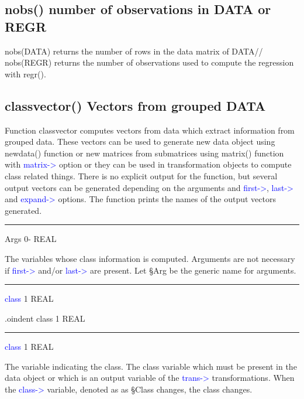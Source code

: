 \subsection{\textcolor{VioletRed}{nobs}() number of observations in DATA or REGR}
\label{nobs}
\textcolor{VioletRed}{nobs}(DATA) returns the number of rows in the data matrix of DATA//
\textcolor{VioletRed}{nobs}(REGR) returns the number of observations used to compute
the regression with \textcolor{VioletRed}{regr}().
\subsection{\textcolor{VioletRed}{classvector}() Vectors from grouped DATA}
\label{classvector}
Function classvector computes vectors from data which extract information from grouped
data. These vectors can be used to generate new data object using \textcolor{VioletRed}{newdata}() function or
new matrices from submatrices using \textcolor{VioletRed}{matrix}() function with \textcolor{blue}{matrix->} option or
they can be used in transformation objects to compute class related things.
There is no explicit output for the function, but several output vectors can
be generated depending on the arguments and \textcolor{blue}{first->}, \textcolor{blue}{last->} and
\textcolor{blue}{expand->} options. The function prints the names of the output vectors generated.
\vspace{0.3cm}
\hrule
\vspace{0.3cm}
\noindent Args \tabto{3cm} 0- \tabto{5cm}  REAL \tabto{7cm}
\begin{changemargin}{3cm}{0cm}
\noindent  The variables whose class information is computed. Arguments
are not necessary if \textcolor{blue}{first->} and/or \textcolor{blue}{last->} are present.
Let §Arg be the generic name for arguments.
\end{changemargin}
\vspace{0.3cm}
\hrule
\vspace{0.3cm}
\noindent \textcolor{blue}{class} \tabto{3cm} 1 \tabto{5cm}  REAL \tabto{7cm}
\begin{changemargin}{3cm}{0cm}
\noindent  .oindent class \tabto{3cm} 1 \tabto{5cm}  REAL \tabto{7cm}
\end{changemargin}
\vspace{0.3cm}
\hrule
\vspace{0.3cm}
\noindent \textcolor{blue}{class} \tabto{3cm} 1 \tabto{5cm}  REAL \tabto{7cm}
\begin{changemargin}{3cm}{0cm}
\noindent The variable indicating the class. The class variable which must be present in the data object or which is
an output variable of the \textcolor{blue}{trans->} transformations.
When the \textcolor{blue}{class->} variable, denoted as
as §Class changes,
the class changes.
\end{changemargin}
